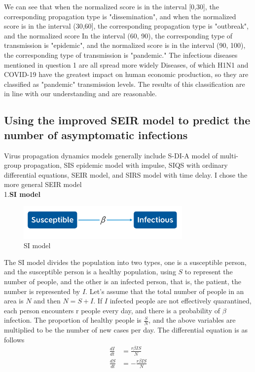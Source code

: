 \documentclass[a4paper, 11pt,twoside=true]{scrartcl}
\begin{document}
\quad We can see that when the normalized score is in the interval [0,30], the corresponding propagation type is "dissemination", and when the normalized score is in the interval (30,60], the corresponding propagation type is "outbreak", and the normalized score In the interval (60, 90), the corresponding type of transmission is "epidemic", and the normalized score is in the interval (90, 100), the corresponding type of transmission is "pandemic." The infectious diseases mentioned in question 1 are all spread more widely Diseases, of which H1N1 and COVID-19 have the greatest impact on human economic production, so they are classified as "pandemic" transmission levels. The results of this classification are in line with our understanding and are reasonable.

\subsection{Using the improved SEIR model to predict the number of asymptomatic infections}
\qquad Virus propagation dynamics models generally include S-DI-A model of multi-group propagation, SIS epidemic model with impulse, SIQS with ordinary differential equations, SEIR model, and SIRS model with time delay. I chose the more general SEIR model\\
1.\textbf{SI model}
\begin{figure}[H]
	\small
	\centering
	\includegraphics[width=8.5cm]{E1}
	\caption{SI model} \label{C1}
\end{figure}
\quad The SI model divides the population into two types, one is a susceptible person, and the susceptible person is a healthy population, using $S$ to represent the number of people, and the other is an infected person, that is, the patient, the number is represented by $I$. Let's assume that the total number of people in an area is $N$ and then $N=S+I$. If $I$ infected people are not effectively quarantined, each person encounters r people every day, and there is a probability of $\beta$ infection. The proportion of healthy people is $\frac {S}{N}$, and the above variables are multiplied to be the number of new cases per day. The differential equation is as follows
$$
\begin{aligned}
\frac{dI}{dt}&=\frac{r\beta IS}{N}    \\
\frac{dS}{dt}&=-\frac{r\beta IS}{N}
\end{aligned}
$$
\end{document}
